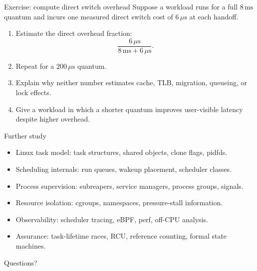 \documentclass[aspectratio=169,11pt]{beamer}
\begin{document}
\begin{frame}{Exercise: compute direct switch overhead}
  Suppose a workload runs for a full $8\,\mathrm{ms}$ quantum and incurs one measured direct switch cost of $6\,\mu\mathrm{s}$ at each handoff.
  \begin{enumerate}
    \item Estimate the direct overhead fraction:
      \[
        \frac{6\,\mu\mathrm{s}}{8\,\mathrm{ms}+6\,\mu\mathrm{s}}.
      \]
    \item Repeat for a $200\,\mu\mathrm{s}$ quantum.
    \item Explain why neither number estimates cache, TLB, migration, queueing, or lock effects.
    \item Give a workload in which a shorter quantum improves user-visible latency despite higher overhead.
  \end{enumerate}
\end{frame}

\begin{frame}{Further study}
  \begin{itemize}
    \item Linux task model: task structures, shared objects, clone flags, pidfds.
    \item Scheduling internals: run queues, wakeup placement, scheduler classes.
    \item Process supervision: subreapers, service managers, process groups, signals.
    \item Resource isolation: cgroups, namespaces, pressure-stall information.
    \item Observability: scheduler tracing, eBPF, perf, off-CPU analysis.
    \item Assurance: task-lifetime races, RCU, reference counting, formal state machines.
  \end{itemize}
  \begin{center}
    \Large Questions?
  \end{center}
\end{frame}
\end{document}
